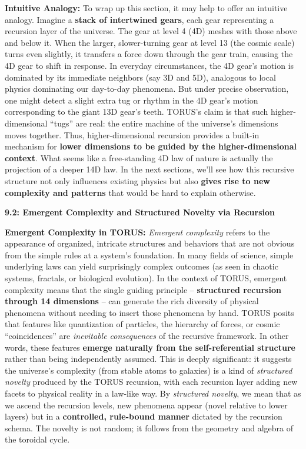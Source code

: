 \documentclass[
]{article}
\begin{document}
{\textbf{Intuitive Analogy:} To wrap up this section, it may help to
offer an intuitive analogy. Imagine a \textbf{stack of intertwined
gears}, each gear representing a recursion layer of the universe. The
gear at level 4 (4D) meshes with those above and below it. When the
larger, slower-turning gear at level 13 (the cosmic scale) turns even
slightly, it transfers a force down through the gear train, causing the
4D gear to shift in response. In everyday circumstances, the 4D gear's
motion is dominated by its immediate neighbors (say 3D and 5D),
analogous to local physics dominating our day-to-day phenomena. But
under precise observation, one might detect a slight extra tug or rhythm
in the 4D gear's motion corresponding to the giant 13D gear's teeth.
TORUS's claim is that such higher-dimensional ``tugs'' are real: the
entire machine of the universe's dimensions moves together. Thus,
higher-dimensional recursion provides a built-in mechanism for
\textbf{lower dimensions to be guided by the higher-dimensional
context}. What seems like a free-standing 4D law of nature is actually
the projection of a deeper 14D law. In the next sections, we'll see how
this recursive structure not only influences existing physics but also
\textbf{gives rise to new complexity and patterns} that would be hard to
explain otherwise.

\textbf{9.2: Emergent Complexity and Structured Novelty via Recursion}

\textbf{Emergent Complexity in TORUS:} \emph{Emergent complexity} refers
to the appearance of organized, intricate structures and behaviors that
are not obvious from the simple rules at a system's foundation. In many
fields of science, simple underlying laws can yield surprisingly complex
outcomes (as seen in chaotic systems, fractals, or biological
evolution). In the context of TORUS, emergent complexity means that the
single guiding principle -- \textbf{structured recursion through 14
dimensions} -- can generate the rich diversity of physical phenomena
without needing to insert those phenomena by hand. TORUS posits that
features like quantization of particles, the hierarchy of forces, or
cosmic ``coincidences'' are \emph{inevitable consequences} of the
recursive framework. In other words, these features \textbf{emerge
naturally from the self-referential structure} rather than being
independently assumed. This is deeply significant: it suggests the
universe's complexity (from stable atoms to galaxies) is a kind of
\emph{structured novelty} produced by the TORUS recursion, with each
recursion layer adding new facets to physical reality in a law-like way.
By \emph{structured novelty}, we mean that as we ascend the recursion
levels, new phenomena appear (novel relative to lower layers) but in a
\textbf{controlled, rule-bound manner} dictated by the recursion schema.
The novelty is not random; it follows from the geometry and algebra of
the toroidal cycle.

}
\end{document}
